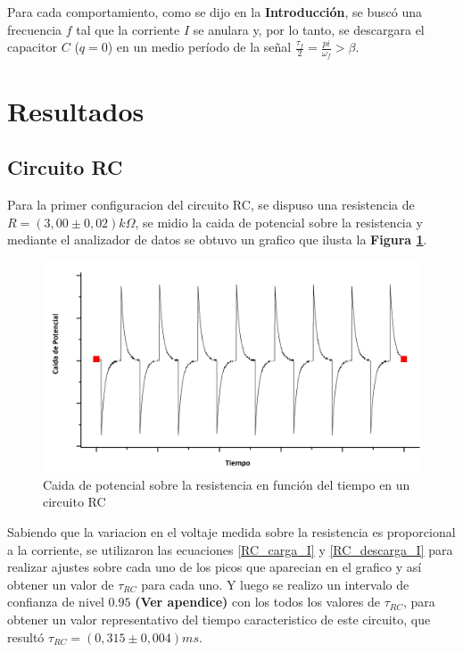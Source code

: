 \documentclass[11pt,a4paper]{article}
\begin{document}
Para cada comportamiento, como se dijo en la \textbf{Introducción}, se buscó una frecuencia $f$ tal que la corriente $I$ se anulara y, por lo tanto, se descargara el capacitor $C$ ($q=0$) en un medio período de la señal $\frac{\tau_f}{2} = \frac{pi}{\omega_f} > \beta$.

\newpage


\section{Resultados}
\label{sec:discusion}

\subsection{Circuito RC}
Para la primer configuracion del circuito RC, se dispuso una resistencia de $R = (3,00\pm0,02)k\Omega$, se midio la caida de potencial sobre la resistencia y mediante el analizador de datos se obtuvo un grafico que ilusta la \textbf{Figura \ref{fig:RC-CR}}.

\begin{figure}[H]
\centering
\includegraphics[scale=0.45]{RC-Caida_en_Resistencia}
  \caption{Caida de potencial sobre la resistencia en función del tiempo en un circuito RC}
  \label{fig:RC-CR}
\end{figure}

Sabiendo que la variacion en el voltaje medida sobre la resistencia es proporcional a la corriente, se utilizaron las ecuaciones \eqref{RC_carga_I} y  \eqref{RC_descarga_I} para realizar ajustes sobre cada uno de los picos que aparecian en el grafico y así obtener un valor de $\tau_{RC}$ para cada uno. Y luego se realizo un intervalo de confianza de nivel $0.95$ \textbf{(Ver apendice)} con los todos los valores de $\tau_{RC}$, para obtener un valor representativo del tiempo caracteristico de este circuito, que resultó $\tau_{RC}=(0,315 \pm 0,004) ms$.
\end{document}
